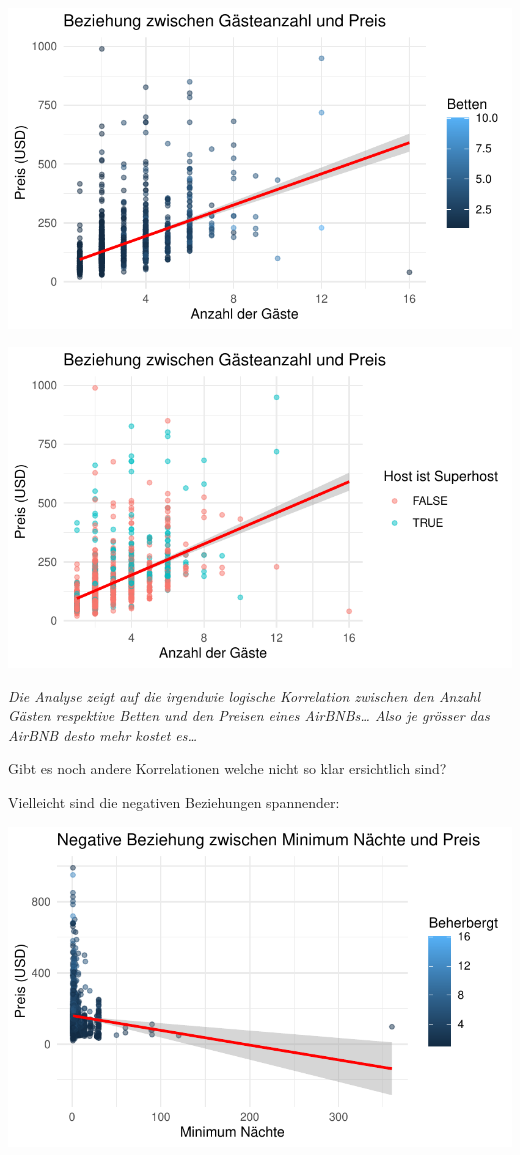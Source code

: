 \documentclass[
  journal,
]{IEEEtran}%
\begin{document}
\includegraphics{main_files/figure-pdf/unnamed-chunk-8-2.pdf}

\includegraphics{main_files/figure-pdf/unnamed-chunk-8-3.pdf}

\emph{Die Analyse zeigt auf die irgendwie logische Korrelation zwischen
den Anzahl Gästen respektive Betten und den Preisen eines
AirBNBs\ldots{} Also je grösser das AirBNB desto mehr kostet es\ldots{}}

Gibt es noch andere Korrelationen welche nicht so klar ersichtlich sind?

Vielleicht sind die negativen Beziehungen spannender:

\includegraphics{main_files/figure-pdf/unnamed-chunk-9-1.pdf}
\end{document}
